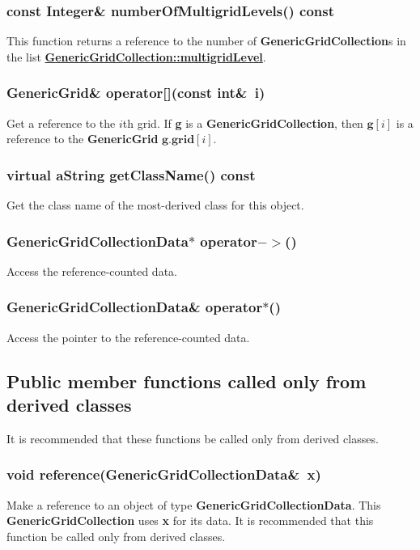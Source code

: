 \documentclass{article}
\begin{document}
  \subsubsection{const Integer\& numberOfMultigridLevels() const}
  \label{GenericGridCollection::numberOfMultigridLevels() const}
    This function returns a reference to the number of \textbf{GenericGridCollection}s in the list
    {\bf{}\hyperref{multigridLevel}{multigridLevel \rm(\S}{)}{GenericGridCollection::multigridLevel}}.

  \subsubsection{GenericGrid\& operator[](const int\&~i)}
  \label{GenericGridCollection::operator[](i)}
    Get a reference to the $i$th grid.
    If \textbf{g} is a \textbf{GenericGridCollection}, then $\textbf{g}[i]$
    is a reference to the \textbf{GenericGrid} $\textbf{g}.\textbf{grid}[i]$.

  \subsubsection{virtual aString getClassName() const}
  \label{GenericGridCollection::getClassName() const}
    Get the class name of the most-derived class for this object.

  \subsubsection{GenericGridCollectionData$*$ operator${-}{>}$()}
  \label{GenericGridCollection::operator->()}
    Access the reference-counted data.

  \subsubsection{GenericGridCollectionData\& operator$*$()}
  \label{GenericGridCollection::operator*()}
    Access the pointer to the reference-counted data.

\subsection{Public member functions called only from derived classes}
\label{GenericGridCollection::PublicDerivedClassMemberFunctions}

It is recommended that these functions be called only from derived classes.

  \subsubsection{void reference(GenericGridCollectionData\&~x)}
  \label{MappedGrid::reference(GenericGridCollectionData_x)}
    Make a reference to an object of type \textbf{GenericGridCollectionData}.
    This \textbf{GenericGridCollection} uses \textbf{x} for its data.
    It is recommended that this function be called only from derived classes.
\end{document}
